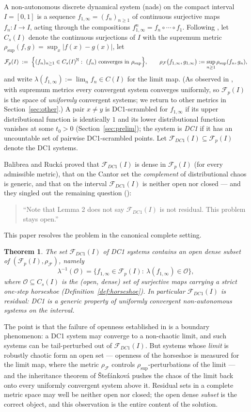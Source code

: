 \documentclass[11pt]{article}
\newtheorem{theorem}{Theorem}[section]
\newcommand{\I}{I}
\newcommand{\Cs}{C_s(\I)}
\newcommand{\Fp}{\mathcal F_p(\I)}
\newcommand{\FDC}{\mathcal F_{DC1}(\I)}
\newcommand{\rsup}{\rho_{\sup}}
\newcommand{\rF}{\rho_{\mathcal F}}
\newcommand{\lm}{\lambda}
\begin{document}
A non-autonomous discrete dynamical system (nads) on the compact interval
$\I=[0,1]$ is a sequence $f_{1,\infty}=(f_n)_{n\ge1}$ of continuous surjective maps
$f_n:\I\to\I$, acting through the compositions
$f^n_{1,\infty}=f_n\circ\cdots\circ f_1$.  Following
\cite{BR,BSS}, let $\Cs$ denote the continuous surjections of $\I$ with the
supremum metric $\rsup(f,g)=\sup_x|f(x)-g(x)|$, let
\[
\Fp\;:=\;\Bigl\{(f_n)_{n\ge1}\in\Cs^{\mathbb N}:\ (f_n)\text{ converges in }\rsup
\Bigr\},
\qquad
\rF\bigl(f_{1,\infty},g_{1,\infty}\bigr):=\sup_{n\ge1}\rsup(f_n,g_n),
\]
and write $\lm(f_{1,\infty}):=\lim_nf_n\in C(\I)$ for the limit map.  (As observed
in \cite{BR}, with supremum metrics every convergent system converges uniformly, so
$\Fp$ is the space of \emph{uniformly} convergent systems; we return to other
metrics in Section~\ref{sec:other}.)  A pair $x\ne y$ is DC1-scrambled for
$f_{1,\infty}$ if its upper distributional function is identically $1$ and its lower
distributional function vanishes at some $t_0>0$ (Section~\ref{sec:prelim}); the
system is \emph{DC1} if it has an uncountable set of pairwise DC1-scrambled points.
Let $\FDC\subseteq\Fp$ denote the DC1 systems.

Balibrea and Ruck\'a \cite{BR} proved that $\FDC$ is dense in $\Fp$ (for every
admissible metric), that on the Cantor set the \emph{complement} of distributional
chaos is generic, and that on the interval $\FDC$ is neither open nor closed --- and
they singled out the remaining question (\cite[Section 4]{BR}):

\begin{quote}
``Note that Lemma 2 does not say $\mathcal F_{DC1}(I)$ is not residual.  This
problem stays open.''
\end{quote}

This paper resolves the problem in the canonical complete setting.

\begin{theorem}\label{thm:main}
The set $\FDC$ of DC1 systems contains an open dense subset of
$(\Fp,\rF)$, namely
\[
\lm^{-1}(\mathcal O)
=\bigl\{f_{1,\infty}\in\Fp:\ \lm(f_{1,\infty})\in\mathcal O\bigr\},
\]
where $\mathcal O\subseteq\Cs$ is the (open, dense) set of surjective maps carrying
a strict one-step horseshoe (Definition~\ref{def:horseshoe}).  In particular
$\FDC$ is residual: DC1 is a generic property of uniformly convergent
non-autonomous systems on the interval.
\end{theorem}

The point is that the failure of openness established in \cite[Lemma 2]{BR} is a
boundary phenomenon: a DC1 system may converge to a non-chaotic limit, and such
systems can be tail-perturbed out of $\FDC$.  But systems whose \emph{limit} is
robustly chaotic form an open set --- openness of the horseshoe is measured for the
limit map, where the metric $\rF$ controls $\rsup$-perturbations of the limit ---
and the inheritance theorem of \v Stef\'ankov\'a \cite{Stefankova} pushes the
chaos of the limit back onto every uniformly convergent system above it.  Residual
sets in a complete metric space may well be neither open nor closed; the open dense
\emph{subset} is the correct object, and this observation is the entire content of
the solution.
\end{document}
